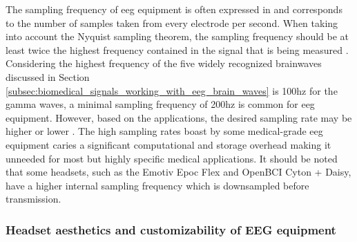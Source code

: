 The sampling frequency of \gls{eeg} equipment is often expressed in  and corresponds to the number of samples taken from every electrode per second.
When taking into account the Nyquist sampling theorem, the sampling frequency should be at least twice the highest frequency contained in the signal that is being measured \citep{nyquist_theory}.
Considering the highest frequency of the five widely recognized brainwaves discussed in Section \ref{subsec:biomedical_signals_working_with_eeg_brain_waves} is 100\gls{hz} for the gamma waves, a minimal sampling frequency of 200\gls{hz} is common for \gls{eeg} equipment.
However, based on the applications, the desired sampling rate may be higher or lower \citep{sampling_rate1, sampling_rate2}.
The high sampling rates boast by some medical-grade \gls{eeg} equipment caries a significant computational and storage overhead making it unneeded for most but highly specific medical applications.
It should be noted that some headsets, such as the Emotiv Epoc Flex and OpenBCI Cyton + Daisy, have a higher internal sampling frequency which is downsampled before transmission.



\subsubsection{Headset aesthetics and customizability of EEG equipment}
\label{subsubsec:biomedical_signals_measuring_brain_equipment_styling}


